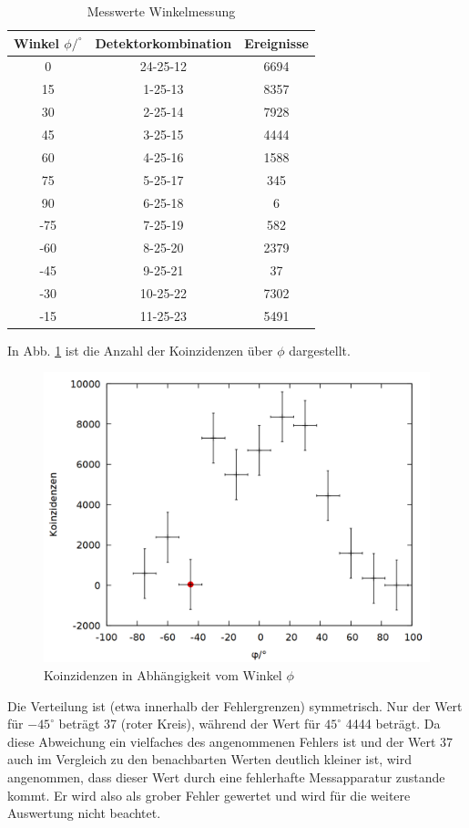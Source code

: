 \begin{table}
\centering
\caption{Messwerte Winkelmessung}
\label{tab:winkel}
\begin{tabular}{ccc}
\toprule
Winkel $\phi/^\circ$& Detektorkombination & Ereignisse\\
\midrule
0 &	24-25-12	&6694\\
15&	1-25-13	&8357\\
30&	2-25-14	&7928\\
45&	3-25-15	&4444\\
60&	4-25-16	&1588\\
75&	5-25-17	&345\\
90&	6-25-18	&6\\
-75&7-25-19	&582\\
-60&8-25-20	&2379\\
-45&9-25-21	&37\\
-30&10-25-22	&7302\\
-15&11-25-23	&5491\\
\bottomrule
\end{tabular}
\end{table}

In Abb. \ref{fig:winkel} ist die Anzahl der Koinzidenzen über $\phi$ dargestellt.

\begin{figure}
\centering
\includegraphics[width=0.75\linewidth]{data/friedrich/winkel.png}
\caption{Koinzidenzen in Abhängigkeit vom Winkel $\phi$}
\label{fig:winkel}
\end{figure}

Die Verteilung ist (etwa innerhalb der Fehlergrenzen) symmetrisch. Nur der Wert für $-45^\circ$ beträgt 37 (roter Kreis), während der Wert für $45^\circ$ 4444 beträgt. Da diese Abweichung ein vielfaches des angenommenen Fehlers ist und der Wert 37 auch im Vergleich zu den benachbarten Werten deutlich kleiner ist, wird angenommen, dass dieser Wert durch eine fehlerhafte Messapparatur zustande kommt. Er wird also als grober Fehler gewertet und wird für die weitere Auswertung nicht beachtet.\\

